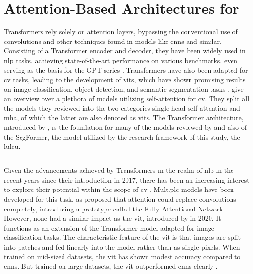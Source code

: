\section{Attention-Based Architectures for }

Transformers rely solely on attention layers, bypassing the conventional use of convolutions and other techniques found in models like \glspl{cnn} and similar. Consisting of a Transformer encoder and decoder, they have been widely used in \gls{nlp} tasks, achieving state-of-the-art performance on various benchmarks, even serving as the basis for the GPT series \autocite{Tzepkenlis.Marthoglou.ea2023,Zhang.Lipton.ea2023}. Transformers have also been adapted for \gls{cv} tasks, leading to the development of \glspl{vit}, which have shown promising results on image classification, object detection, and semantic segmentation tasks \autocite{Bi.Zhu.ea2021,Han.Wang.ea2023,Khan.Naseer.ea2021,Liu.Zhang.ea2024}. \textcite{Khan.Naseer.ea2021} give an overview over a plethora of models utilizing self-attention for \gls{cv}. They split all the models they reviewed into the two categories single-head self-attention and \gls{mha}, of which the latter are also denoted as \glspl{vit}. The Transformer architecture, introduced by \textcite{Vaswani.Shazeer.ea2017}, is the foundation for many of the models reviewed by \textcite{Khan.Naseer.ea2021} and also of the SegFormer, the model utilized by the research framework of this study, the \gls{lulcu}. 

\subsection{}

Given the advancements achieved by Transformers in the realm of \gls{nlp} in the recent years since their introduction in 2017, there has been an increasing interest to explore their potential within the scope of \gls{cv} \autocite{Khan.Naseer.ea2021}. Multiple models have been developed for this task, as \textcite{Cordonnier.Loukas.ea2020} proposed that attention could replace convolutions completely, introducing a prototype called the Fully Attentional Network. However, none had a similar impact as the \gls{vit}, introduced by \textcite{Dosovitskiy.Beyer.ea2020} in 2020. It functions as an extension of the Transformer model adapted for image classification tasks. The characteristic feature of the \gls{vit} is that images are split into patches and fed linearly into the model rather than as single pixels. When trained on mid-sized datasets, the \gls{vit} has shown modest accuracy compared to \glspl{cnn}. But trained on large datasets, the \gls{vit} outperformed \glspl{cnn} clearly \autocite{Bi.Zhu.ea2021,Dosovitskiy.Beyer.ea2020,Khan.Naseer.ea2021}.

